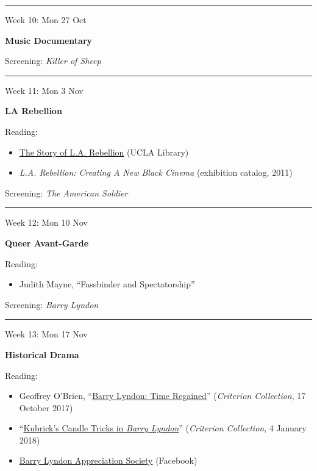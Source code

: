 \documentclass[
  letterpaper,
  DIV=11,
  numbers=noendperiod,
  oneside]{scrartcl}
\providecommand{\tightlist}{%
  \setlength{\itemsep}{0pt}\setlength{\parskip}{0pt}}
\begin{document}
\begin{center}\rule{0.5\linewidth}{0.5pt}\end{center}

Week 10: Mon 27 Oct

\textbf{Music Documentary}

Screening: \emph{Killer of Sheep}

\begin{center}\rule{0.5\linewidth}{0.5pt}\end{center}

Week 11: Mon 3 Nov

\textbf{LA Rebellion}

Reading:

\begin{itemize}
\tightlist
\item
  \href{https://www.cinema.ucla.edu/la-rebellion/story-la-rebellion}{The
  Story of L.A. Rebellion} (UCLA Library)
\item
  \emph{L.A. Rebellion: Creating A New Black Cinema} (exhibition
  catalog, 2011)
\end{itemize}

Screening: \emph{The American Soldier}

\begin{center}\rule{0.5\linewidth}{0.5pt}\end{center}

Week 12: Mon 10 Nov

\textbf{Queer Avant-Garde}

Reading:

\begin{itemize}
\tightlist
\item
  Judith Mayne, ``Fassbinder and Spectatorship''
\end{itemize}

Screening: \emph{Barry Lyndon}

\begin{center}\rule{0.5\linewidth}{0.5pt}\end{center}

Week 13: Mon 17 Nov

\textbf{Historical Drama}

Reading:

\begin{itemize}
\tightlist
\item
  Geoffrey O'Brien,
  ``\href{https://www.criterion.com/current/posts/5047-barry-lyndon-time-regained}{Barry
  Lyndon: Time Regained}'' (\emph{Criterion Collection}, 17 October
  2017)
\item
  ``\href{https://www.criterion.com/current/posts/5059-kubrick-s-candle-tricks-in-barry-lyndon}{Kubrick's
  Candle Tricks in \emph{Barry Lyndon}}'' (\emph{Criterion Collection},
  4 January 2018)
\item
  \href{https://www.facebook.com/groups/4160171565/}{Barry Lyndon
  Appreciation Society} (Facebook)
\end{itemize}
\end{document}
